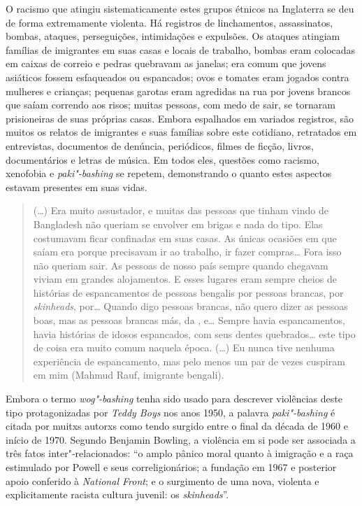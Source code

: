 O racismo que atingiu sistematicamente estes grupos étnicos na Inglaterra se deu de forma extremamente violenta. Há registros de linchamentos, assassinatos, bombas, ataques, perseguições, intimidações e expulsões. Os ataques atingiam famílias de imigrantes em suas casas e locais de trabalho, bombas eram colocadas em caixas de correio e pedras quebravam as janelas; era comum que jovens asiáticos fossem esfaqueados ou espancados; ovos e tomates eram jogados contra mulheres e crianças; pequenas garotas eram agredidas na rua por jovens brancos que saíam correndo aos risos; muitas pessoas, com medo de sair, se tornaram prisioneiras de suas próprias casas. Embora espalhados em variados registros, são muitos os relatos de imigrantes e suas famílias sobre este cotidiano, retratados em entrevistas, documentos de denúncia, periódicos, filmes de ficção, livros, documentários e letras de música. Em todos eles, questões como racismo, xenofobia e \emph{paki"-bashing} se repetem, demonstrando o quanto estes aspectos estavam presentes em suas vidas.

\begin{quote}
(\ldots{}) Era muito assustador, e muitas das pessoas que tinham vindo de Bangladesh não queriam se envolver em brigas e nada do tipo. Elas costumavam ficar confinadas em suas casas. As únicas ocasiões em que saíam era porque precisavam ir ao trabalho, ir fazer compras\ldots{} Fora isso não queriam sair. As pessoas de nosso país sempre quando chegavam viviam em grandes alojamentos. E esses lugares eram sempre cheios de histórias de espancamentos de pessoas bengalis por pessoas brancas, por \emph{skinheads}, por\ldots{} Quando digo pessoas brancas, não quero dizer as pessoas boas, mas as pessoas brancas más, da , e\ldots{} Sempre havia espancamentos, havia histórias de idosos espancados, com seus dentes quebrados\ldots{} este tipo de coisa era muito comum naquela época. (\ldots{}) Eu nunca tive nenhuma experiência de espancamento, mas pelo menos um par de vezes cuspiram em mim (Mahmud Rauf, imigrante bengali).
\end{quote}

Embora o termo \emph{wog"-bashing} tenha sido usado para descrever violências deste tipo protagonizadas por \emph{Teddy Boys} nos anos 1950, a palavra \emph{paki"-bashing} é citada por muitxs autorxs como tendo surgido entre o final da década de 1960 e início de 1970. Segundo Benjamin Bowling, a violência em si pode ser associada a três fatos inter"-relacionados: ``o amplo pânico moral quanto à imigração e a raça estimulado por Powell e seus correligionários; a fundação em 1967 e posterior apoio conferido à \emph{National Front}; e o surgimento de uma nova, violenta e explicitamente racista cultura juvenil: os \emph{skinheads}''.

